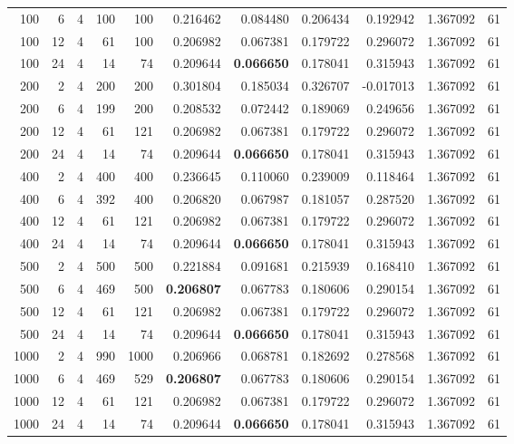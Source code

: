 \begin{table}
\begin{tabular}{rrrrrrrrrrr}
100 & 6 & 4 & 100 & 100 & 0.216462 & 0.084480 & 0.206434 & 0.192942 & 1.367092 & 61 \\
100 & 12 & 4 & 61 & 100 & 0.206982 & 0.067381 & 0.179722 & 0.296072 & 1.367092 & 61 \\
100 & 24 & 4 & 14 & 74 & 0.209644 & \textbf{0.066650} & 0.178041 & 0.315943 & 1.367092 & 61 \\
200 & 2 & 4 & 200 & 200 & 0.301804 & 0.185034 & 0.326707 & -0.017013 & 1.367092 & 61 \\
200 & 6 & 4 & 199 & 200 & 0.208532 & 0.072442 & 0.189069 & 0.249656 & 1.367092 & 61 \\
200 & 12 & 4 & 61 & 121 & 0.206982 & 0.067381 & 0.179722 & 0.296072 & 1.367092 & 61 \\
200 & 24 & 4 & 14 & 74 & 0.209644 & \textbf{0.066650} & 0.178041 & 0.315943 & 1.367092 & 61 \\
400 & 2 & 4 & 400 & 400 & 0.236645 & 0.110060 & 0.239009 & 0.118464 & 1.367092 & 61 \\
400 & 6 & 4 & 392 & 400 & 0.206820 & 0.067987 & 0.181057 & 0.287520 & 1.367092 & 61 \\
400 & 12 & 4 & 61 & 121 & 0.206982 & 0.067381 & 0.179722 & 0.296072 & 1.367092 & 61 \\
400 & 24 & 4 & 14 & 74 & 0.209644 & \textbf{0.066650} & 0.178041 & 0.315943 & 1.367092 & 61 \\
500 & 2 & 4 & 500 & 500 & 0.221884 & 0.091681 & 0.215939 & 0.168410 & 1.367092 & 61 \\
500 & 6 & 4 & 469 & 500 & \textbf{0.206807} & 0.067783 & 0.180606 & 0.290154 & 1.367092 & 61 \\
500 & 12 & 4 & 61 & 121 & 0.206982 & 0.067381 & 0.179722 & 0.296072 & 1.367092 & 61 \\
500 & 24 & 4 & 14 & 74 & 0.209644 & \textbf{0.066650} & 0.178041 & 0.315943 & 1.367092 & 61 \\
1000 & 2 & 4 & 990 & 1000 & 0.206966 & 0.068781 & 0.182692 & 0.278568 & 1.367092 & 61 \\
1000 & 6 & 4 & 469 & 529 & \textbf{0.206807} & 0.067783 & 0.180606 & 0.290154 & 1.367092 & 61 \\
1000 & 12 & 4 & 61 & 121 & 0.206982 & 0.067381 & 0.179722 & 0.296072 & 1.367092 & 61 \\
1000 & 24 & 4 & 14 & 74 & 0.209644 & \textbf{0.066650} & 0.178041 & 0.315943 & 1.367092 & 61 \\
\bottomrule
\end{tabular}
\end{table}

